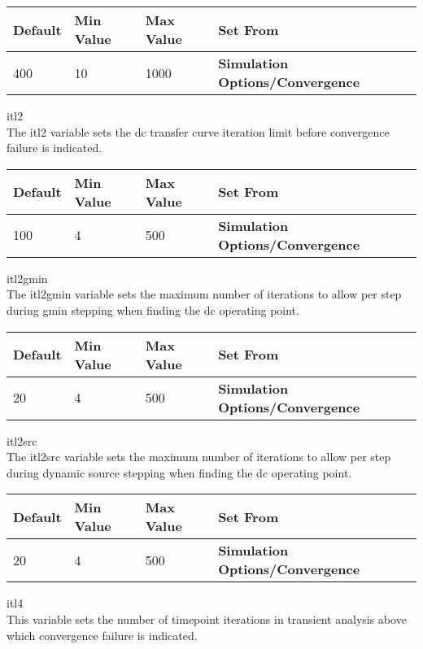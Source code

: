 \begin{description}
\begin{tabular}{|l|l|l|l|}\hline
\bf Default & \bf Min Value & \bf Max Value & \bf Set From\\ \hline
400 & 10 & 1000 & \bf Simulation Options/Convergence\\ \hline
\end{tabular}
 
\item{\et itl2}\\
The {\et itl2} variable sets the dc transfer curve iteration limit
before convergence failure is indicated.

\begin{tabular}{|l|l|l|l|}\hline
\bf Default & \bf Min Value & \bf Max Value & \bf Set From\\ \hline
100 & 4 & 500 & \bf Simulation Options/Convergence\\ \hline
\end{tabular}

\item{\et itl2gmin}\\
The {\et itl2gmin} variable sets the maximum number of iterations to
allow per step during gmin stepping when finding the dc operating
point.

\begin{tabular}{|l|l|l|l|}\hline
\bf Default & \bf Min Value & \bf Max Value & \bf Set From\\ \hline
20 & 4 & 500 & \bf Simulation Options/Convergence\\ \hline
\end{tabular}

\item{\et itl2src}\\
The {\et itl2src} variable sets the maximum number of iterations to
allow per step during dynamic source stepping when finding the dc
operating point.

\begin{tabular}{|l|l|l|l|}\hline
\bf Default & \bf Min Value & \bf Max Value & \bf Set From\\ \hline
20 & 4 & 500 & \bf Simulation Options/Convergence\\ \hline
\end{tabular}

\item{\et itl4}\\
This variable sets the number of timepoint iterations in transient
analysis above which convergence failure is indicated.


\end{description}
